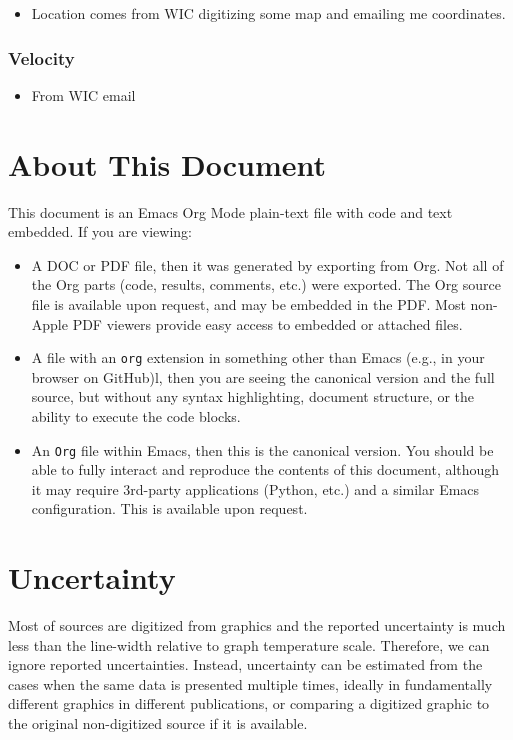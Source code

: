 \documentclass[article,a4paper,times,11pt,twoside]{article}
\begin{document}
\begin{itemize}
\item Location comes from WIC digitizing some map and emailing me coordinates.
\end{itemize}

\subsubsection{Velocity}
\label{sec:orgc41f952}

\begin{itemize}
\item From WIC email
\end{itemize}

\clearpage
\section{About This Document}
\label{sec:orgd9faa18}
This document is an Emacs Org Mode plain-text file with code and text embedded. If you are viewing:
\begin{itemize}
\item A DOC or PDF file, then it was generated by exporting from Org. Not all of the Org parts (code, results, comments, etc.) were exported. The Org source file is available upon request, and may be embedded in the PDF. Most non-Apple PDF viewers provide easy access to embedded or attached files.
\item A file with an \texttt{org} extension in something other than Emacs (e.g., in your browser on GitHub)l, then you are seeing the canonical version and the full source, but without any syntax highlighting, document structure, or the ability to execute the code blocks.
\item An \texttt{Org} file within Emacs, then this is the canonical version. You should be able to fully interact and reproduce the contents of this document, although it may require 3rd-party applications (Python, etc.) and a similar Emacs configuration. This is available upon request.
\end{itemize}

\clearpage
\section{Uncertainty}
\label{sec:org9005239}
Most of sources are digitized from graphics and the reported uncertainty is much less than the line-width relative to graph temperature scale. Therefore, we can ignore reported uncertainties. Instead, uncertainty can be estimated from the cases when the same data is presented multiple times, ideally in fundamentally different graphics in different publications, or comparing a digitized graphic to the original non-digitized source if it is available.
\end{document}
